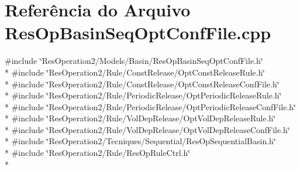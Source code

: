 \section{Referência do Arquivo Res\+Op\+Basin\+Seq\+Opt\+Conf\+File.\+cpp}
\label{_res_op_basin_seq_opt_conf_file_8cpp}
{\ttfamily \#include \char`\"{}Res\+Operation2/\+Models/\+Basin/\+Res\+Op\+Basin\+Seq\+Opt\+Conf\+File.\+h\char`\"{}}\\*
{\ttfamily \#include \char`\"{}Res\+Operation2/\+Rule/\+Const\+Release/\+Opt\+Const\+Release\+Rule.\+h\char`\"{}}\\*
{\ttfamily \#include \char`\"{}Res\+Operation2/\+Rule/\+Const\+Release/\+Opt\+Const\+Release\+Conf\+File.\+h\char`\"{}}\\*
{\ttfamily \#include \char`\"{}Res\+Operation2/\+Rule/\+Periodic\+Release/\+Opt\+Periodic\+Release\+Rule.\+h\char`\"{}}\\*
{\ttfamily \#include \char`\"{}Res\+Operation2/\+Rule/\+Periodic\+Release/\+Opt\+Periodic\+Release\+Conf\+File.\+h\char`\"{}}\\*
{\ttfamily \#include \char`\"{}Res\+Operation2/\+Rule/\+Vol\+Dep\+Release/\+Opt\+Vol\+Dep\+Release\+Rule.\+h\char`\"{}}\\*
{\ttfamily \#include \char`\"{}Res\+Operation2/\+Rule/\+Vol\+Dep\+Release/\+Opt\+Vol\+Dep\+Release\+Conf\+File.\+h\char`\"{}}\\*
{\ttfamily \#include \char`\"{}Res\+Operation2/\+Tecniques/\+Sequential/\+Res\+Op\+Sequential\+Basin.\+h\char`\"{}}\\*
{\ttfamily \#include \char`\"{}Res\+Operation2/\+Rule/\+Res\+Op\+Rule\+Ctrl.\+h\char`\"{}}\\*
